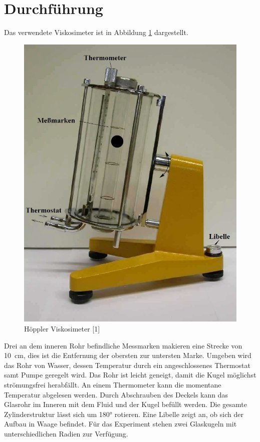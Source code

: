 \section{Durchführung}

Das verwendete Viskosimeter ist in Abbildung \ref{fig:Aufbau} dargestellt. 

\begin{figure}
\center
\includegraphics[scale=0.3]{content/Aufbau.jpg}
\caption{Höppler Viskosimeter [1]}
\label{fig:Aufbau}
\end{figure}

Drei an dem inneren Rohr befindliche Messmarken makieren eine Strecke 
von \SI{10}{\centi\meter}, dies ist die Entfernung der obersten zur untersten Marke. 
Umgeben wird das Rohr von Wasser, dessen Temperatur durch ein angeschlossenes 
Thermostat samt Pumpe geregelt wird. Das Rohr ist leicht geneigt, damit 
die Kugel möglichst strömungsfrei herabfällt.
An einem Thermometer kann die momentane Temperatur abgelesen werden. 
Durch Abschrauben des Deckels kann das Glasrohr im Inneren mit dem Fluid und 
der Kugel befüllt werden. Die gesamte Zylinderstruktur lässt sich um 
180° rotieren. Eine Libelle zeigt an, ob sich der Aufbau in Waage
befindet. Für das Experiment stehen zwei Glaskugeln mit unterschiedlichen
Radien zur Verfügung. 

